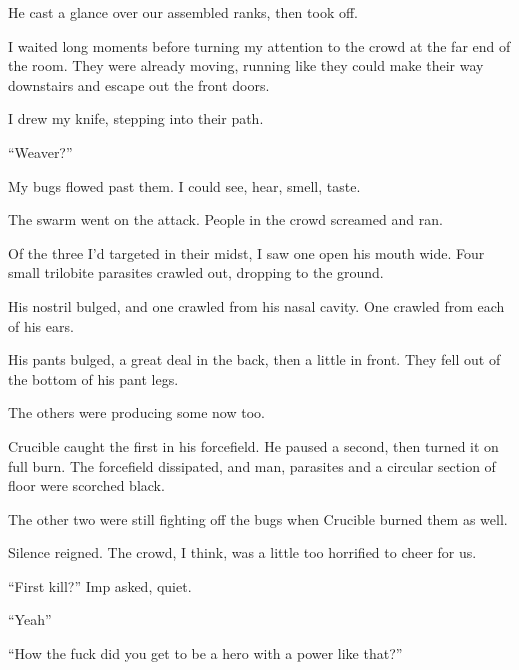 He cast a glance over our assembled ranks, then took off.



I waited long moments before turning my attention to the crowd at the far end of the room.  They were already moving, running like they could make their way downstairs and escape out the front doors.



I drew my knife, stepping into their path.



``Weaver?''



My bugs flowed past them.  I could see, hear, smell, taste.



The swarm went on the attack.  People in the crowd screamed and ran.



Of the three I'd targeted in their midst, I saw one open his mouth wide.  Four small trilobite parasites crawled out, dropping to the ground.



His nostril bulged, and one crawled from his nasal cavity.    One crawled from each of his ears.



His pants bulged, a great deal in the back, then a little in front.  They fell out of the bottom of his pant legs.



The others were producing some now too.



Crucible caught the first in his forcefield.  He paused a second, then turned it on full burn.  The forcefield dissipated, and man, parasites and a circular section of floor were scorched black.



The other two were still fighting off the bugs when Crucible burned them as well.



Silence reigned.  The crowd, I think, was a little too horrified to cheer for us.



``First kill?'' Imp asked, quiet.



``Yeah''



``How the fuck did you get to be a hero with a power like that?''




